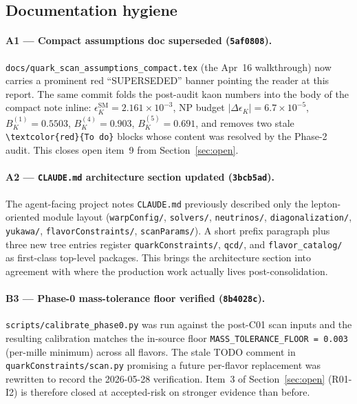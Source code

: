 \documentclass[11pt]{article}
\newcommand{\eK}{\epsilon_K}
\newcommand{\DeK}{\Delta\eK}
\begin{document}
\subsection{Documentation hygiene}
\label{sec:followup-docs}

\paragraph{A1 --- Compact assumptions doc superseded
(\texttt{5af0808}).}
\texttt{docs/quark\_scan\_assumptions\_compact.tex} (the Apr~16
walkthrough) now carries a prominent red ``SUPERSEDED'' banner
pointing the reader at this report.  The same commit folds the
post-audit kaon numbers into the body of the compact note inline:
$\eK^{\mathrm{SM}} = 2.161\times10^{-3}$, NP budget
$|\DeK| = 6.7\times10^{-5}$, $B_K^{(1)} = 0.5503$, $B_K^{(4)} = 0.903$,
$B_K^{(5)} = 0.691$, and removes two stale \texttt{\textbackslash textcolor\{red\}\{To do\}} blocks
whose content was resolved by the Phase-2 audit.  This closes open item~9
from Section~\ref{sec:open}.

\paragraph{A2 --- \texttt{CLAUDE.md} architecture section updated
(\texttt{3bcb5ad}).}
The agent-facing project notes \texttt{CLAUDE.md} previously described
only the lepton-oriented module layout
(\texttt{warpConfig/}, \texttt{solvers/}, \texttt{neutrinos/},
\texttt{diagonalization/}, \texttt{yukawa/}, \texttt{flavorConstraints/},
\texttt{scanParams/}).  A short prefix paragraph plus three new
tree entries register \texttt{quarkConstraints/}, \texttt{qcd/}, and
\texttt{flavor\_catalog/} as first-class top-level packages.  This
brings the architecture section into agreement with where the
production work actually lives post-consolidation.

\paragraph{B3 --- Phase-0 mass-tolerance floor verified
(\texttt{8b4028c}).}
\texttt{scripts/calibrate\_phase0.py} was run against the
post-C01 scan inputs and the resulting calibration matches the
in-source floor \texttt{MASS\_TOLERANCE\_FLOOR = 0.003} (per-mille
minimum) across all flavors.  The stale TODO comment in
\texttt{quarkConstraints/scan.py} promising a future per-flavor
replacement was rewritten to record the 2026-05-28 verification.
Item~3 of Section~\ref{sec:open} (R01-I2) is therefore closed at
accepted-risk on stronger evidence than before.
\end{document}
